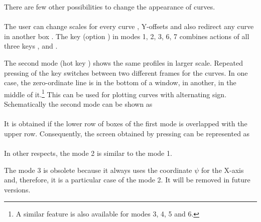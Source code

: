 There are few other possibilities to change the appearance of curves.
\bigskip\\
\\[2ex]
The user can change scales for every curve , Y-offsets 
and also redirect any curve in another box . 
The key  (option ) in modes 1, 2, 3, 6, 7 combines
actions of all three keys ,  and .

The second mode (hot key ) shows the same profiles in larger
scale.
Repeated pressing of the key  switches between two different
frames for the curves. 
In one case, the zero-ordinate line is in the bottom of a window, in
another, in the middle of it.\footnote
{A similar feature is also available for modes 3, 4, 5 and 6.}
This can be used for plotting curves with alternating sign.
Schematically the second mode can be shown as
\smallskip\\
\\[2ex]
It is obtained if the lower row of boxes of the first mode is overlapped
with the upper row.
Consequently, the screen obtained by pressing  can be
represented as 
\bigskip\\
\\[2ex]
In other respects, the mode 2 is similar to the mode 1.

The mode 3 is obsolete because it always uses the coordinate $\psi$ for
the X-axis and, therefore, it is a particular case of the mode 2.
It will be removed in future versions.

